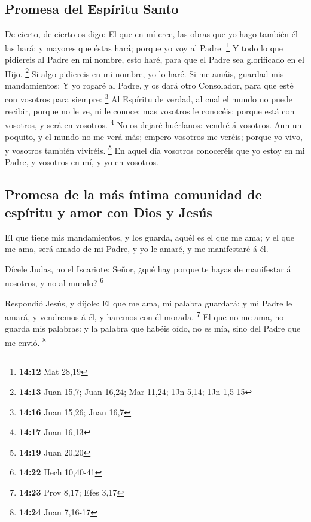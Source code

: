 \hypertarget{promesa-del-espuxedritu-santo}{%
\subsection{Promesa del Espíritu
Santo}\label{promesa-del-espuxedritu-santo}}

 De cierto, de cierto os digo: El que en mí cree, las
obras que yo hago también él las hará; y mayores que éstas hará; porque
yo voy al Padre. \footnote{\textbf{14:12} Mat 28,19}  Y
todo lo que pidiereis al Padre en mi nombre, esto haré, para que el
Padre sea glorificado en el Hijo. \footnote{\textbf{14:13} Juan 15,7;
  Juan 16,24; Mar 11,24; 1Jn 5,14; 1Jn 1,5-15}  Si algo
pidiereis en mi nombre, yo lo haré.  Si me amáis, guardad
mis mandamientos;  Y yo rogaré al Padre, y os dará otro
Consolador, para que esté con vosotros para siempre: \footnote{\textbf{14:16}
  Juan 15,26; Juan 16,7}  Al Espíritu de verdad, al cual
el mundo no puede recibir, porque no le ve, ni le conoce: mas vosotros
le conocéis; porque está con vosotros, y será en vosotros. \footnote{\textbf{14:17}
  Juan 16,13}  No os dejaré huérfanos: vendré á vosotros.
 Aun un poquito, y el mundo no me verá más; empero
vosotros me veréis; porque yo vivo, y vosotros también viviréis.
\footnote{\textbf{14:19} Juan 20,20}  En aquel día
vosotros conoceréis que yo estoy en mi Padre, y vosotros en mí, y yo en
vosotros.

\hypertarget{promesa-de-la-muxe1s-uxedntima-comunidad-de-espuxedritu-y-amor-con-dios-y-jesuxfas}{%
\subsection{Promesa de la más íntima comunidad de espíritu y amor con
Dios y
Jesús}\label{promesa-de-la-muxe1s-uxedntima-comunidad-de-espuxedritu-y-amor-con-dios-y-jesuxfas}}

 El que tiene mis mandamientos, y los guarda, aquél es el
que me ama; y el que me ama, será amado de mi Padre, y yo le amaré, y me
manifestaré á él.

 Dícele Judas, no el Iscariote: Señor, ¿qué hay porque te
hayas de manifestar á nosotros, y no al mundo? \footnote{\textbf{14:22}
  Hech 10,40-41}

 Respondió Jesús, y díjole: El que me ama, mi palabra
guardará; y mi Padre le amará, y vendremos á él, y haremos con él
morada. \footnote{\textbf{14:23} Prov 8,17; Efes 3,17} 
El que no me ama, no guarda mis palabras: y la palabra que habéis oído,
no es mía, sino del Padre que me envió. \footnote{\textbf{14:24} Juan
  7,16-17}


